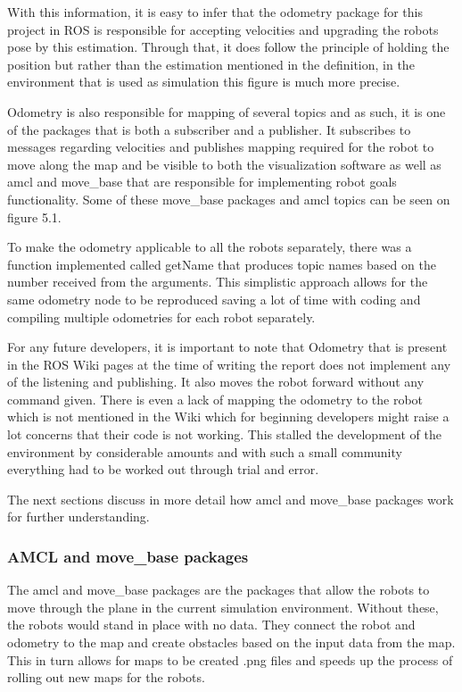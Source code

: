       With this information, it is easy to infer that the odometry package for this project in ROS is responsible for accepting velocities and upgrading the robots pose by this estimation. Through that, it does follow the principle of holding the position but rather than the estimation mentioned in the definition, in the environment that is used as simulation this figure is much more precise.

      Odometry is also responsible for mapping of several topics and as such, it is one of the packages that is both a subscriber and a publisher. It subscribes to messages regarding velocities and publishes mapping required for the robot to move along the map and be visible to both the visualization software as well as amcl and move\_base that are responsible for implementing robot goals functionality. Some of these move\_base packages and amcl topics can be seen on figure 5.1.

      To make the odometry applicable to all the robots separately, there was a function implemented called getName that produces topic names based on the number received from the arguments. This simplistic approach allows for the same odometry node to be reproduced saving a lot of time with coding and compiling multiple odometries for each robot separately.

      For any future developers, it is important to note that Odometry that is present in the ROS Wiki pages at the time of writing the report does not implement any of the listening and publishing. It also moves the robot forward without any command given. There is even a lack of mapping the odometry to the robot which is not mentioned in the Wiki which for beginning developers might raise a lot concerns that their code is not working. This stalled the development of the environment by considerable amounts and with such a small community everything had to be worked out through trial and error.

      The next sections discuss in more detail how amcl and move\_base packages work for further understanding.

    \subsubsection{AMCL and move\_base packages}
      The amcl and move\_base packages are the packages that allow the robots to move through the plane in the current simulation environment. Without these, the robots would stand in place with no data. They connect the robot and odometry to the map and create obstacles based on the input data from the map. This in turn allows for maps to be created .png files and speeds up the process of rolling out new maps for the robots.

